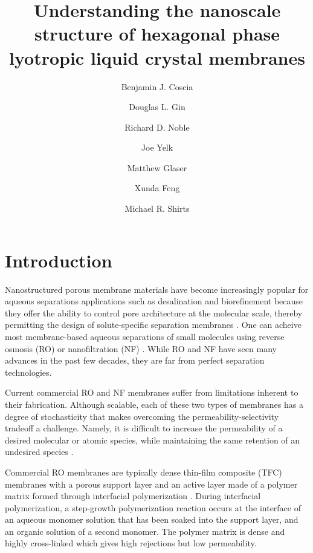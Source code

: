 \documentclass{article}
\title{Understanding the nanoscale structure of hexagonal phase
lyotropic liquid crystal membranes}
\author{Benjamin J. Coscia \and Douglas L. Gin \and Richard D. Noble
\and Joe Yelk \and Matthew Glaser \and Xunda Feng \and Michael R.
Shirts}
\begin{document}
  
  \graphicspath{{./figures/}}
  \maketitle

  \section{Introduction}
  
  Nanostructured porous membrane materials have become increasingly popular for
  aqueous separations applications such as desalination and biorefinement because
  they offer the ability to control pore architecture at the molecular scale,
  thereby permitting the design of solute-specific separation membranes
  \cite{humplik_nanostructured_2011}. One can acheive most membrane-based aqueous separations of
  small molecules using reverse osmosis (RO) or nanofiltration
  (NF) \cite{van_der_bruggen_review_2003}. While RO and NF have seen many
  advances in the past few decades, they are far from perfect separation
  technologies. 

  Current commercial RO and NF membranes suffer from limitations inherent to
  their fabrication. Although scalable, each of these two types of membranes has
  a degree of stochasticity that makes overcoming the permeability-selectivity
  tradeoff a challenge.  Namely, it is difficult to increase the permeability of
  a desired molecular or atomic species, while maintaining the same retention of
  an undesired species \cite{werber_materials_2016}. 


  Commercial RO membranes are typically dense thin-film composite (TFC)
  membranes with a porous support layer and an active layer made of a polymer
  matrix formed through interfacial polymerization \cite{jeong_interfacial_2007}.
  During interfacial polymerization, a step-growth polymerization reaction occurs
  at the interface of an aqueous monomer solution that has been soaked into the
  support layer, and an organic solution of a second monomer. The polymer matrix
  is dense and highly cross-linked which gives high rejections but low
  permeability. 
\end{document}
